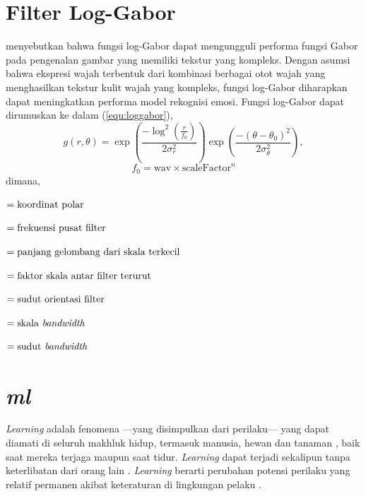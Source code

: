 \section{Filter Log-Gabor}
 menyebutkan bahwa fungsi log-Gabor  dapat mengungguli performa fungsi Gabor pada pengenalan gambar yang memiliki tekstur yang kompleks. Dengan asumsi bahwa ekspresi wajah terbentuk dari kombinasi berbagai otot wajah yang menghasilkan tekstur kulit wajah yang kompleks, fungsi log-Gabor diharapkan dapat meningkatkan performa model rekognisi emosi. Fungsi log-Gabor dapat dirumuskan  ke dalam (\ref{equ:loggabor}),
\begin{equation}
    g(r,\theta) = \exp{\left(\frac{-\log^2{\left(\frac{r}{f_0}\right)}}{2\sigma^2_r}\right)} \exp{\left(\frac{-(\theta-\theta_0)^2}{2\sigma^2_\theta}\right)},
    \label{equ:loggabor}
\end{equation}
\begin{equation}
    f_0 = \text{wav}\times\text{scaleFactor}^n
\end{equation}
dimana,
\begin{description}[align=parleft,labelwidth=2cm]
    \item[$(r, \theta)$] $= \parbox[t]{10.3cm}{koordinat polar}$
    \item[$f_0$] $= \parbox[t]{10.3cm}{frekuensi pusat filter}$
    \item[\normalfont{wav}] $= \parbox[t]{10.3cm}{panjang gelombang dari skala terkecil}$
    \item[\normalfont{scaleFactor}] $= \parbox[t]{10.3cm}{faktor skala antar filter terurut}$
    \item[$\theta$] $= \parbox[t]{10.3cm}{sudut orientasi filter}$
    \item[$\sigma_r$] $= \parbox[t]{10.3cm}{skala {\itshape bandwidth}}$
    \item[$\sigma_\theta$] $= \parbox[t]{10.3cm}{sudut {\itshape bandwidth}}$
\end{description}


\section{\textit{\acrlong{ml}}}
\textit{Learning} adalah fenomena ---yang disimpulkan dari perilaku--- yang dapat diamati di seluruh makhluk hidup, termasuk manusia, hewan  dan tanaman , baik saat mereka terjaga maupun saat tidur. \textit{Learning} dapat terjadi sekalipun tanpa keterlibatan dari orang lain . \textit{Learning} berarti perubahan potensi perilaku yang relatif permanen akibat keteraturan di lingkungan pelaku .

